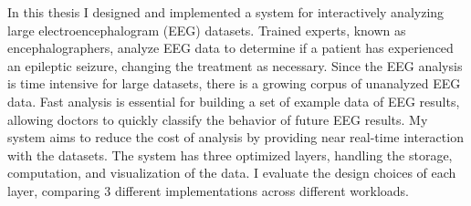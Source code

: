 % 
% 
%

In this thesis I designed and implemented a system for interactively analyzing
large electroencephalogram (EEG) datasets. Trained experts, known as
encephalographers, analyze EEG data to determine if a patient has experienced
an epileptic seizure, changing the treatment as necessary. Since the EEG
analysis is time intensive for large datasets, there is a growing corpus of
unanalyzed EEG data. Fast analysis is essential for building a set of example
data of EEG results, allowing doctors to quickly classify the behavior of
future EEG results. My system aims to reduce the cost of analysis by providing
near real-time interaction with the datasets. The system has three optimized
layers, handling the storage, computation, and visualization of the data. I
evaluate the design choices of each layer, comparing 3 different
implementations across different workloads.
